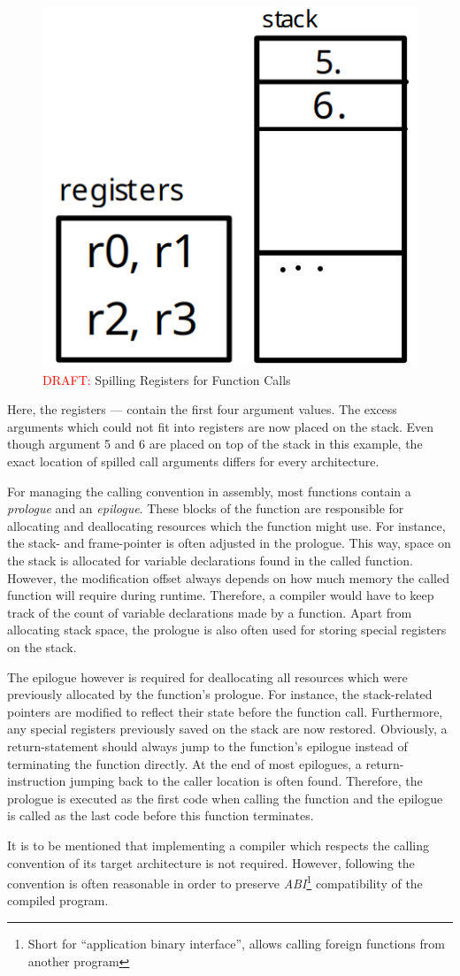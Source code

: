 \begin{figure}
	\centering
	\includegraphics[width=.2\textwidth]{./calling_convention_draft.png}
	\caption{\textcolor{red}{DRAFT:} Spilling Registers for Function Calls}\label{fig:call_conv_spill}
\end{figure}

Here, the registers  —  contain the first four argument values.
The excess arguments which could not fit into registers are now placed on the stack.
Even though argument 5 and 6 are placed on top of the stack in this example,
the exact location of spilled call arguments differs for every architecture.

For managing the calling convention in assembly, most functions contain a \emph{prologue} and an \emph{epilogue}.
These blocks of the function are responsible for allocating and deallocating resources which the function might use.
For instance, the stack- and frame-pointer is often adjusted in the prologue.
This way, space on the stack is allocated for variable declarations found in the called function.
However, the modification offset always depends on how much memory the called function will require during runtime.
Therefore, a compiler would have to keep track of the count of variable declarations made by a function.
Apart from allocating stack space, the prologue is also often used for storing special registers on the stack.

The epilogue however is required for deallocating all resources which were previously allocated by the function's prologue.
For instance, the stack-related pointers are modified to reflect their state before the function call.
Furthermore, any special registers previously saved on the stack are now restored.
Obviously, a return-statement should always jump to the function's epilogue instead of terminating the function directly.
At the end of most epilogues, a return-instruction jumping back to the caller location is often found.
Therefore, the prologue is executed as the first code when calling the function and the epilogue is called as the last code before this function terminates.

It is to be mentioned that implementing a compiler which respects the calling convention of its target architecture is not required.
However, following the convention is often reasonable in order to preserve \emph{ABI}\footnote{Short for \enquote{application binary interface}, allows calling foreign functions from another program} compatibility of the compiled program.


